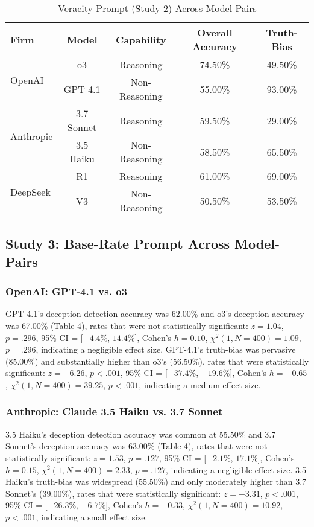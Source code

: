 \documentclass{article}
\begin{document}
\clearpage
\begin{table}[ht]
\centering
\caption{Veracity Prompt (Study 2) Across Model Pairs}
\begin{tabular}{lcccc}
\toprule
\textbf{Firm} & \textbf{Model} & \textbf{Capability} & \textbf{Overall Accuracy} & \textbf{Truth-Bias} \\
\midrule
\multirow{2}{*}{OpenAI} & o3 & Reasoning & 74.50\% & 49.50\%  \\
& GPT-4.1 & Non-Reasoning & 55.00\% & 93.00\% \\
\midrule
\multirow{2}{*}{Anthropic} & 3.7 Sonnet & Reasoning & 59.50\% & 29.00\% \\
& 3.5 Haiku & Non-Reasoning & 58.50\% & 65.50\% \\
\midrule
\multirow{2}{*}{DeepSeek} & R1 & Reasoning & 61.00\% & 69.00\% \\
& V3 & Non-Reasoning & 50.50\% & 53.50\% \\
\bottomrule
\end{tabular}
\label{tab:study2_model_comparison}
\end{table}

\subsection{Study 3: Base-Rate Prompt Across Model-Pairs}

\subsubsection{OpenAI: GPT-4.1 vs. o3}
 
GPT-4.1's deception detection accuracy was 62.00\% and o3's deception accuracy was 67.00\% (Table 4), rates that were not statistically significant:  $z = 1.04$, $p = .296$, 95\% CI = [$-4.4\%$, $14.4\%$], Cohen’s $h =0.10$, $\chi^2(1, N = 400) = 1.09$, $p = .296$, indicating a negligible effect size. GPT-4.1's truth-bias was pervasive (85.00\%) and substantially higher than o3's (56.50\%), rates that were statistically significant: $z = -6.26$, $p < .001$, 95\% CI = [$-37.4\%$, $-19.6\%$], Cohen’s $h = -0.65$, $\chi^2(1, N = 400) = 39.25$, $p < .001$, indicating a medium effect size.

\subsubsection{Anthropic: Claude 3.5 Haiku vs. 3.7 Sonnet}

3.5 Haiku's deception detection accuracy was common at 55.50\% and 3.7 Sonnet's deception accuracy was 63.00\% (Table 4), rates that were not statistically significant:  $z = 1.53$, $p = .127$, 95\% CI = [$-2.1\%$, $17.1\%$], Cohen’s $h =0.15$, $\chi^2(1, N = 400) = 2.33$, $p = .127$, indicating a negligible effect size. 3.5 Haiku's truth-bias was widespread (55.50\%) and only moderately higher than 3.7 Sonnet's (39.00\%), rates that were statistically significant: $z = -3.31$, $p < .001$, 95\% CI = [$-26.3\%$, $-6.7\%$], Cohen’s $h = -0.33$, $\chi^2(1, N = 400) = 10.92$, $p < .001$, indicating a small effect size.
\end{document}
